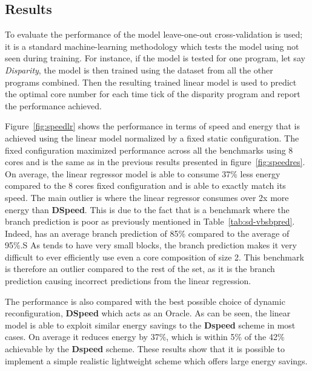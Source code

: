 \subsection{Results}

To evaluate the performance of the model leave-one-out cross-validation  is used; it is a standard machine-learning methodology which tests the model using not seen during training.
For instance, if the model is tested for one program, let say \textit{Disparity}, the model is then trained using the dataset from all the other programs combined.
Then the resulting trained linear model is used to predict the optimal core number for each time tick of the disparity program and report the performance achieved.

Figure~\ref{fig:speedlr} shows the performance in terms of speed and energy that is achieved using the linear model normalized by a fixed static configuration.
The fixed configuration maximized performance across all the benchmarks using 8 cores and is the same as in the previous results presented in figure~\ref{fig:speedres}.
On average, the linear regressor model is able to consume 37\% less energy compared to the 8 cores fixed configuration and is able to exactly match its speed.
The main outlier is  where the linear regressor consumes over 2x more energy than \textbf{DSpeed}.
This is due to the fact that  is a benchmark where the branch prediction is poor as previously mentioned in Table~\ref{tab:sd-vbsbpred}.
Indeed,  has an average branch prediction of 85\% compared to the average of 95\%.S
As  tends to have very small blocks, the branch prediction makes it very difficult to ever efficiently use even a core composition of size 2.
This benchmark is therefore an outlier compared to the rest of the set, as it is the branch prediction causing incorrect predictions from the linear regression.

The performance is also compared with the best possible choice of dynamic reconfiguration, \textbf{DSpeed} which acts as an Oracle.
As can be seen, the linear model is able to exploit similar energy savings to the \textbf{Dspeed} scheme in most cases.
On average it reduces energy by 37\%, which is within 5\% of the 42\% achievable by the \textbf{Dspeed} scheme.
These results show that it is possible to implement a simple realistic lightweight scheme which offers large energy savings.
